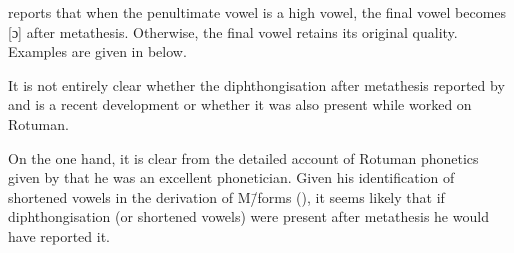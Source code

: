 \begin{exe}
	\label{ex:VCV->VVC-Vam}
\end{exe}

\citet[208]{be87} reports that when the penultimate vowel is a high vowel,
the final vowel becomes [ɔ] after metathesis.
Otherwise, the final vowel retains its original quality.
Examples are given in  below.

\begin{exe}
	\label{ex:VCV->VVC-Bes}
\end{exe}

It is not entirely clear whether the diphthongisation
after metathesis reported by \cite{be87} and \cite{va02}
is a recent development or whether it was also present
while \citeauthor{ch40} worked on Rotuman.

On the one hand, it is clear from the detailed account of
Rotuman phonetics given by \citet[64--84]{ch40}
that he was an excellent phonetician.
Given his identification of shortened vowels
in the derivation of M\=/forms (),
it seems likely that if diphthongisation (or shortened vowels)
were present after metathesis he would have reported it.

